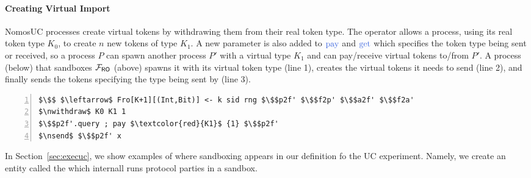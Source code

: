 \paragraph{Creating Virtual Import}
NomosUC processes create virtual tokens by withdrawing them from their real token type. 
The operator  allows a process, using its real token type $K_0$, to create $n$ new tokens of type $K_1$.
A new parameter is also added to $\npay$ and $\nget$ which specifies the token type being sent or received, so a process $P$ can spawn another process $P'$ with a virtual type $K_1$ and can pay/receive virtual tokens to/from $P'$.
A process (below) that sandboxes $\mathcal{F}_{{\mathsf {RO}}}$ (above) spawns it with its virtual token type (line 1), creates the virtual tokens it needs to send (line 2), and finally sends the tokens specifying the type being sent by \inline{$\npay$} (line 3).
\begin{lstlisting}[basicstyle=\scriptsize\BeraMonottFamily, frame=single, mathescape, numbers=left, xleftmargin=2em, xrightmargin=2em]
$\$$ $\leftarrow$ Fro[K+1][(Int,Bit)] <- k sid rng $\$$p2f' $\$$f2p' $\$$a2f' $\$$f2a' 
$\nwithdraw$ K0 K1 1
$\$$p2f'.query ; pay $\textcolor{red}{K1}$ {1} $\$$p2f' 
$\nsend$ $\$$p2f' x
\end{lstlisting}
In Section~\ref{sec:execuc}, we show examples of where sandboxing appears in our definition fo the UC experiment. Namely, we create an entity called the \partywrapper which internall runs protocol parties in a sandbox.

